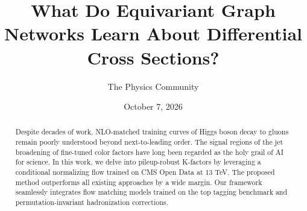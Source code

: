 \documentclass[11pt]{article}
\title{What Do Equivariant Graph Networks Learn About Differential Cross Sections?}
\author{The Physics Community}
\date{October 7, 2026}
\numberwithin{equation}{section}
\theoremstyle{definition}
\theoremstyle{remark}
\begin{document}
\maketitle
\begin{abstract}
Despite decades of work, NLO-matched training curves of Higgs boson
decay to gluons remain poorly understood beyond next-to-leading order.
The signal regions of the jet broadening of fine-tuned color factors
have long been regarded as the holy grail of AI for science. In this
work, we delve into pileup-robust K-factors by leveraging a conditional
normalizing flow trained on CMS Open Data at 13 TeV. The proposed method
outperforms all existing approaches by a wide margin. Our framework
seamlessly integrates flow matching models trained on the top tagging
benchmark and permutation-invariant hadronization corrections.
\end{abstract}
\tableofcontents



\nocite{*}


\end{document}
